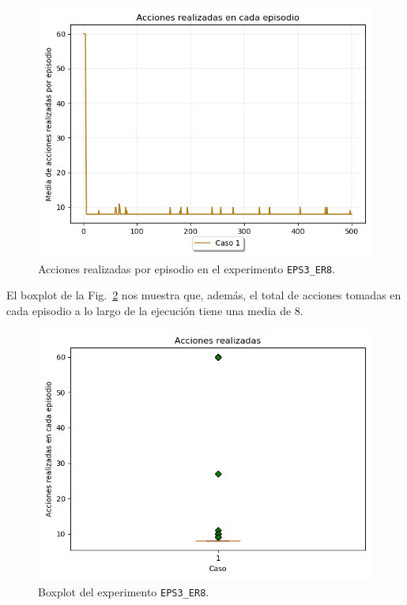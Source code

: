 \begin{figure}
    \centering
    \includegraphics[scale=0.4]{cap5_experimentacion/images/dim5_lr0.01_ep0.7_acciones.png}
    \caption{Acciones realizadas por episodio en el experimento \texttt{EPS3\_ER8}.}
    \label{fig:dim5_lr0.01_ep0.7_acciones}
\end{figure}

El boxplot de la Fig.~\ref{fig:dim5_lr0.01_ep0.7_boxplot} nos muestra que, además, el total de acciones tomadas en cada episodio a lo largo de la ejecución tiene una media de 8. \\

\begin{figure}
    \centering
    \includegraphics[scale=0.4]{cap5_experimentacion/images/dim5_lr0.01_ep0.7_boxplot.png}
    \caption{Boxplot del experimento \texttt{EPS3\_ER8}.}
    \label{fig:dim5_lr0.01_ep0.7_boxplot}
\end{figure}

